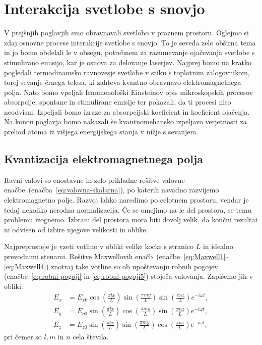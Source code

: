 
\chapter{Interakcija svetlobe s snovjo}

V prejšnjih poglavjih smo obravnavali svetlobo v praznem prostoru. Oglejmo si
zdaj osnovne procese interakcije svetlobe s snovjo. To je seveda zelo
obširna tema in jo bomo obdelali le v obsegu, potrebnem za
razumevanje ojačevanja svetlobe s stimulirano emisijo, kar je osnova za
delovanje laserjev. Najprej bomo na kratko pogledali termodinamsko ravnovesje 
svetlobe v stiku s toplotnim zalogovnikom, torej sevanje črnega telesa, ki 
zahteva kvantno obravnavo elektromagnetnega polja. Nato bomo vpeljali fenomenološki
Einsteinov opis mikroskopskih procesov absorpcije, spontane in stimulirane
emisije ter pokazali, da ti procesi niso neodvisni. Izpeljali bomo
izraze za absorpcijski koeficient in koeficient ojačenja. Na koncu poglavja
bomo nakazali še kvantnomehansko izpeljavo verjetnosti za prehod
atoma iz višjega energijskega stanja v nižje s sevanjem.

\section{Kvantizacija elektromagnetnega polja}
Ravni valovi so enostavne in zelo prikladne rešitve valovne 
enačbe~(enačba~\ref{eq:valovna-skalarna}), po katerih navadno razvijemo elektromagnetno polje. Razvoj
lahko naredimo po celotnem prostoru, vendar je tedaj nekoliko nerodna normalizacija. 
Če se omejimo na le del prostora, se temu problemu izognemo. Izbrani del prostora 
mora biti dovolj velik, da končni rezultat ni odvisen od izbire 
njegove velikosti in oblike.

Najpreprosteje je vzeti votlino v obliki velike kocke s stranico
$L$ in idealno prevodnimi stenami. Rešitve Maxwellovih enačb~(enačbe~\ref{eq:Maxwell1}--\ref{eq:Maxwell4}) 
znotraj take votline so ob upoštevanju robnih pogojev 
(enačbe~\ref{eq:robni-pogoji} in \ref{eq:robni-pogoji5}) 
stoječa valovanja. Zapišemo jih v obliki:
\begin{align}
E_{x} & =  E_{x0}\cos\left(\frac{\pi lx}{L}\right)\sin\left(\frac{\pi my}{L}\right)\sin\left(\frac{\pi nz}{L}\right)e^{-i\omega t},\nonumber \\
E_{y} & =  E_{y0}\sin\left(\frac{\pi lx}{L}\right)\cos\left(\frac{\pi my}{L}\right)\sin\left(\frac{\pi nz}{L}\right)e^{-i\omega t},\nonumber \\
E_{z} & =  E_{z0}\sin\left(\frac{\pi lx}{L}\right)\sin\left(\frac{\pi my}{L}\right)\cos\left(\frac{\pi nz}{L}\right)e^{-i\omega t},
\label{eq:stojece_votlina}
\end{align}
pri čemer so $l,m$ in $n$ cela števila. 

